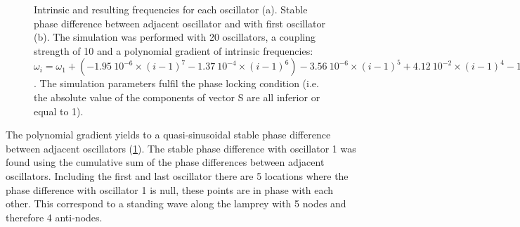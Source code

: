 \documentclass[a4paper]{scrartcl}
\begin{document}
\begin{figure}[h]
\begin{subfigure}[b]{0.49\textwidth}
		\caption{}
	\end{subfigure}
	\caption{Intrinsic and resulting frequencies for each oscillator (a). Stable phase difference between adjacent oscillator and with first oscillator (b). The simulation was performed with 20 oscillators, a coupling strength of 10 and a polynomial gradient of intrinsic frequencies: $\omega_i = \omega_{1} + (-1.95\ 10^{-6}\times(i-1)^7 -1.37\ 10^{-4}\times(i-1)^6) -3.56\ 10^{-6}\times(i-1)^5 +4.12\ 10^{-2}\times(i-1)^4 -1.76\ 10^{-1}\times(i-1)^3 -2.43\ 10^{-1}\times(i-1)^2 +3.16\times(i-1)-4.02$. The simulation parameters fulfil the phase locking condition (i.e. the absolute value of the components of vector S are all inferior or equal to 1).}\label{stand}
\end{figure}

The polynomial gradient yields to a quasi-sinusoidal stable phase difference between adjacent oscillators (\ref{stand}). The stable phase difference with oscillator 1 was found using the cumulative sum of the phase differences between adjacent oscillators. Including the first and last oscillator there are 5 locations where the phase difference with oscillator 1 is null, these points are in phase with each other. This correspond to a standing wave along the lamprey with 5 nodes and therefore 4 anti-nodes.
\end{document}

